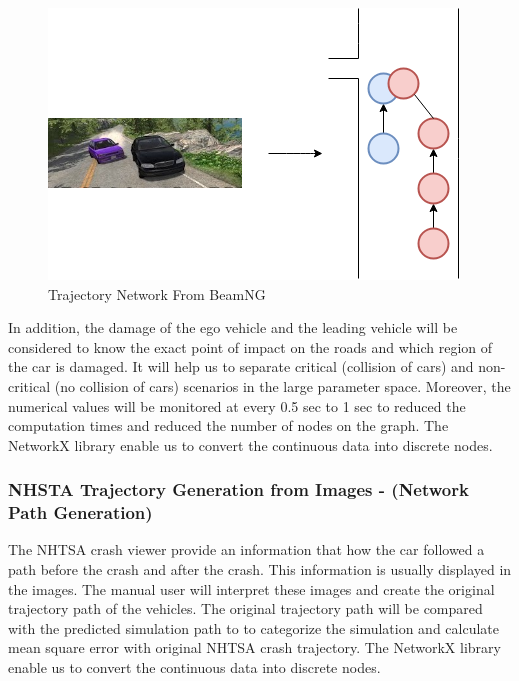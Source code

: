 \begin{figure}[H]
\centering
  \includegraphics[scale= 0.4]{pictures/SO1_Beam_Net.png}
  \caption{Trajectory Network From BeamNG}
\end{figure}

In addition, the damage of the ego vehicle and the leading vehicle will be considered to know the exact point of impact on the roads and which region of the car is damaged. It will help us to separate critical (collision of cars) and non-critical (no collision of cars) scenarios in the large parameter space. Moreover, the numerical values will be monitored at every 0.5 sec to 1 sec to reduced the computation times and reduced the number of nodes on the graph. The NetworkX \cite{SciPyProceedings_11} library enable us to convert the continuous data into discrete nodes.     

\subsubsection{NHSTA Trajectory Generation from Images - (Network Path Generation)}
The NHTSA crash viewer provide an information that how the car followed a path before the crash and after the crash. This information is usually displayed in the images. The manual user will interpret these images and create the original trajectory path of the vehicles. The original trajectory path will be compared with the predicted simulation path to to categorize the simulation and calculate mean square error with original NHTSA crash trajectory. The NetworkX \cite{SciPyProceedings_11} library enable us to convert the continuous data into discrete nodes.      

